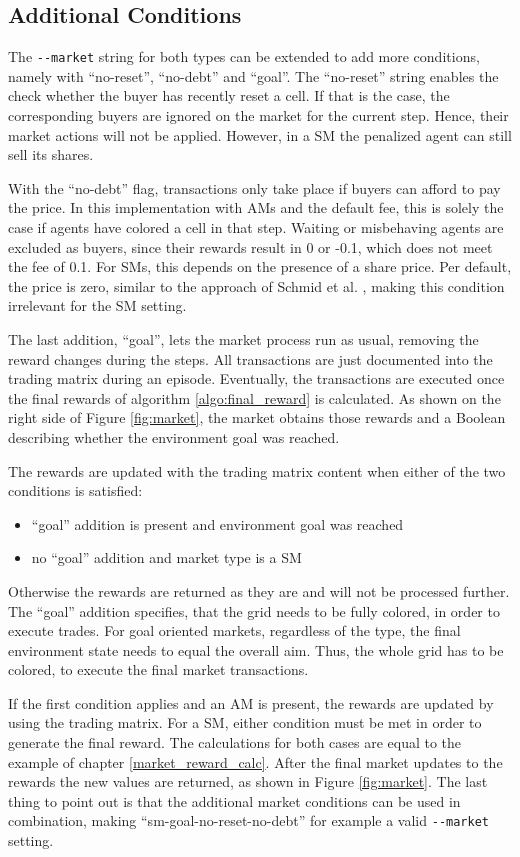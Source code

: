 \subsection{Additional Conditions}\label{market_conditions}
The \verb|--market| string for both types can be extended to add more conditions, namely with ``no-reset'', ``no-debt'' and ``goal''. The ``no-reset'' string enables the check whether the buyer has recently reset a cell. If that is the case, the corresponding buyers are ignored on the market for the current step. Hence, their market actions will not be applied. However, in a SM the penalized agent can still sell its shares. 

With the ``no-debt'' flag, transactions only take place if buyers can afford to pay the price. In this implementation with AMs and the default fee, this is solely the case if agents have colored a cell in that step. Waiting or misbehaving agents are excluded as buyers, since their rewards result in 0 or -0.1, which does not meet the fee of 0.1. For SMs, this depends on the presence of a share price. Per default, the price is zero, similar to the approach of Schmid et al. \cite{scbe21}, making this condition irrelevant for the SM setting.

The last addition, ``goal'', lets the market process run as usual, removing the reward changes during the steps. All transactions are just documented into the trading matrix during an episode. Eventually, the transactions are executed once the final rewards of algorithm \ref{algo:final_reward} is calculated. As shown on the right side of Figure \ref{fig:market}, the market obtains those rewards and a Boolean describing whether the environment goal was reached.

The rewards are updated with the trading matrix content when either of the two conditions is satisfied:
\begin{itemize}
    \item ``goal'' addition is present and environment goal was reached
    \item no ``goal'' addition and market type is a SM
\end{itemize}
Otherwise the rewards are returned as they are and will not be processed further. The ``goal'' addition specifies, that the grid needs to be fully colored, in order to execute trades. For goal oriented markets, regardless of the type, the final environment state needs to equal the overall aim. Thus, the whole grid has to be colored, to execute the final market transactions.

If the first condition applies and an AM is present, the rewards are updated by using the trading matrix. For a SM, either condition must be met in order to generate the final reward. The calculations for both cases are equal to the example of chapter \ref{market_reward_calc}. After the final market updates to the rewards the new values are returned, as shown in Figure \ref{fig:market}. The last thing to point out is that the additional market conditions can be used in combination, making ``sm-goal-no-reset-no-debt'' for example a valid \verb|--market| setting.